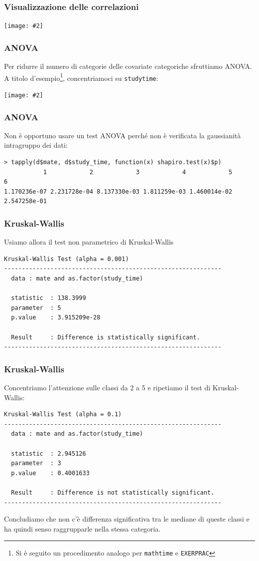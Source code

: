 \documentclass{beamer}
\newcommand{\fg}[2]{%
  \begin{center}
      \texttt{[image: \#2]}%
  \end{center}
}
\begin{document}
\begin{frame}
\frametitle{Visualizzazione delle correlazioni}
\fg{0.6}{cor.png}
\end{frame}



\begin{frame}
\frametitle{ANOVA}
Per ridurre il numero di categorie delle covariate categoriche sfruttiamo ANOVA. 
A titolo d'esempio\footnote{Si è seguito un procedimento analogo per \texttt{mathtime} e \texttt{EXERPRAC}}, concentriamoci su \texttt{studytime}:
\fg{0.6}{boxplotst.png}
\end{frame}

\begin{frame}[fragile]
\frametitle{ANOVA}
Non è opportuno usare un test ANOVA perché non è verificata la gaussianità intragruppo dei dati: 

{\scriptsize
\begin{verbatim}
> tapply(d$mate, d$study_time, function(x) shapiro.test(x)$p)
           1            2            3            4            5            6 
1.170236e-07 2.231728e-04 8.137330e-03 1.811259e-03 1.460014e-02 2.547258e-01 
\end{verbatim}
} 
\end{frame}

\begin{frame}[fragile]
\frametitle{Kruskal-Wallis}
Usiamo allora il test non parametrico di Kruskal-Wallis
{\scriptsize
\begin{verbatim}
Kruskal-Wallis Test (alpha = 0.001) 
------------------------------------------------------------- 
  data : mate and as.factor(study_time) 

  statistic  : 138.3999 
  parameter  : 5 
  p.value    : 3.915209e-28 

  Result     : Difference is statistically significant. 
------------------------------------------------------------- 
\end{verbatim}
} 
\end{frame}

\begin{frame}[fragile]
\frametitle{Kruskal-Wallis}
Concentriamo l'attenzione sulle classi da 2 a 5 e ripetiamo il test di Kruskal-Wallis:
{\scriptsize
\begin{verbatim}
Kruskal-Wallis Test (alpha = 0.1) 
------------------------------------------------------------- 
  data : mate and as.factor(study_time) 

  statistic  : 2.945126 
  parameter  : 3 
  p.value    : 0.4001633 

  Result     : Difference is not statistically significant. 
------------------------------------------------------------- 
\end{verbatim}
}
Concludiamo che non c'è differenza significativa tra le mediane di queste classi e ha quindi senso raggrupparle nella stessa categoria.
\end{frame}
\end{document}
